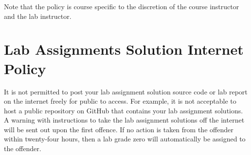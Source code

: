 Note that the policy is course specific to the discretion of the course instructor and the lab instructor.

\section*{Lab Assignments Solution Internet Policy} 
It is not permitted to post your lab assignment solution source code or lab report on the internet freely for public to access. For example, it is not acceptable to host a public repository on GitHub that contains your lab assignment solutions. A warning with instructions to take the lab assignment solutions off the internet will be sent out upon the first offence. If no action is taken from the offender within twenty-four hours, then a lab grade zero will automatically be assigned to the offender.
    
